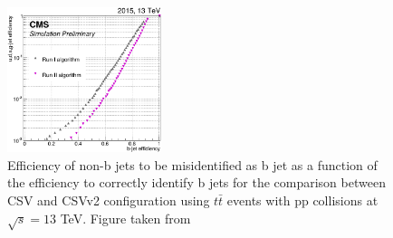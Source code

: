 \begin{figure}[ht]%
  \begin{center}
    \includegraphics[width=0.4\textwidth]{figuras/Chapter3/bjet_run1vsrun2.png}
    \caption{Efficiency of non-b jets to be misidentified as b jet as a function of the efficiency to correctly identify
             b jets for the comparison between CSV and CSVv2 configuration using $t\bar{t}$ events with pp collisions 
	     at $\sqrt{s}=13$ TeV. Figure taken from \cite{1742-6596-664-8-082055}}
    \label{fig:bjetRun1vsRun2}
  \end{center}
\end{figure}















